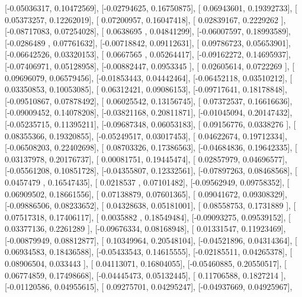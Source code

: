 \documentclass{article}
\begin{document}
       [-0.05036317,  0.10472569],
       [-0.02794625,  0.16750875],
       [ 0.06943601,  0.19392733],
       [ 0.05373257,  0.12262019],
       [ 0.07200957,  0.16047418],
       [ 0.02839167,  0.2229262 ],
       [-0.08717083,  0.07254028],
       [ 0.0638695 ,  0.04841299],
       [-0.06007597,  0.18993589],
       [-0.0286489 ,  0.07761632],
       [-0.00718842,  0.09112631],
       [ 0.09786723,  0.05653901],
       [-0.06642526,  0.03320153],
       [ 0.0667565 ,  0.05264417],
       [-0.09162272,  0.14695937],
       [-0.07406971,  0.05128958],
       [-0.00882447,  0.0953345 ],
       [ 0.02605614,  0.0722269 ],
       [ 0.09696079,  0.06579456],
       [-0.01853443,  0.04442464],
       [-0.06452118,  0.03510212],
       [ 0.03350853,  0.10053085],
       [ 0.06312421,  0.09086153],
       [-0.09717641,  0.18178848],
       [-0.09510867,  0.07878492],
       [ 0.06025542,  0.13156745],
       [ 0.07372537,  0.16616636],
       [-0.09009452,  0.14078208],
       [-0.03821168,  0.20811871],
       [-0.01045094,  0.20147432],
       [-0.05235715,  0.11395211],
       [-0.09687348,  0.06053183],
       [ 0.09156776,  0.0338276 ],
       [ 0.08355366,  0.19320855],
       [-0.05249517,  0.03017453],
       [ 0.04622674,  0.19712334],
       [-0.06508203,  0.22402698],
       [ 0.08703326,  0.17386563],
       [-0.04684836,  0.19642335],
       [ 0.03137978,  0.20176737],
       [ 0.00081751,  0.19445474],
       [ 0.02857979,  0.04696577],
       [-0.05561208,  0.10851728],
       [-0.04355807,  0.12332561],
       [-0.07897263,  0.08468568],
       [ 0.0457479 ,  0.16547435],
       [ 0.0218537 ,  0.07101482],
       [-0.09562949,  0.09758352],
       [ 0.06909502,  0.18661556],
       [ 0.07138879,  0.07601365],
       [ 0.09041672,  0.09308329],
       [-0.09886506,  0.08233652],
       [ 0.04328638,  0.05181001],
       [ 0.08558753,  0.1731889 ],
       [ 0.07517318,  0.17406117],
       [ 0.0035882 ,  0.18549484],
       [-0.09093275,  0.09539152],
       [ 0.03377136,  0.2261289 ],
       [-0.09676334,  0.08168948],
       [ 0.01331547,  0.11923469],
       [-0.00879949,  0.08812877],
       [ 0.10349964,  0.20548104],
       [-0.04521896,  0.04314364],
       [ 0.06934583,  0.18436588],
       [-0.05433543,  0.14615555],
       [-0.02185511,  0.04265378],
       [ 0.08906504,  0.033443  ],
       [ 0.04113071,  0.16804055],
       [-0.05460885,  0.20550517],
       [ 0.06774859,  0.17498668],
       [-0.04445473,  0.05132445],
       [ 0.11706588,  0.1827214 ],
       [-0.01120586,  0.04955615],
       [ 0.09275701,  0.04295247],
       [-0.04937669,  0.04925967],
\end{document}
